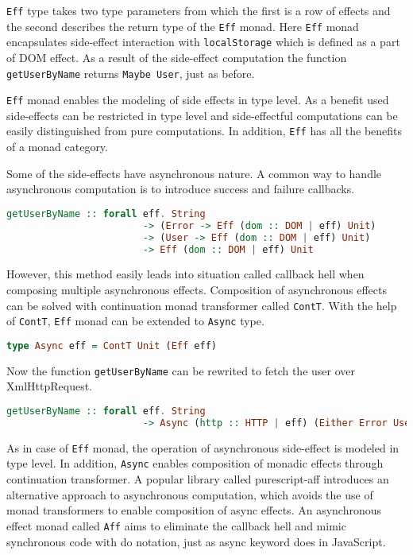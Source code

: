 \documentclass[article]{aaltoseries}
\begin{document}
      \lstinline|Eff| type takes two type parameters from which the first is a
      row of effects and the second describes the return type of the
      \lstinline|Eff| monad. Here \lstinline|Eff| monad encapsulates side-effect
      interaction with \lstinline|localStorage| which is defined as a part of
      DOM effect. As a result of the side-effect computation the function
      \lstinline|getUserByName| returns \lstinline|Maybe User|, just as before.
 
      \lstinline|Eff| monad enables the modeling of side effects in type level.
      As a benefit used side-effects can be restricted in type level and
      side-effectful computations can be easily distinguished from pure
      computations. In addition, \lstinline|Eff| has all the benefits of a monad
      category.
 
      Some of the side-effects have asynchronous nature. A common way to handle
      asynchronous computation is to introduce success and failure callbacks.
 
      \begin{lstlisting}[language=Haskell]
        getUserByName :: forall eff. String 
                        -> (Error -> Eff (dom :: DOM | eff) Unit) 
                        -> (User -> Eff (dom :: DOM | eff) Unit)
                        -> Eff (dom :: DOM | eff) Unit
      \end{lstlisting}
 
      However, this method easily leads into situation called callback hell when
      composing multiple asynchronous effects. Composition of asynchronous
      effects can be solved with continuation monad transformer called
      \lstinline|ContT|. With the help of \lstinline|ContT|, \lstinline|Eff|
      monad can be extended to \lstinline|Async| type.
 
      \begin{lstlisting}[language=Haskell]
        type Async eff = ContT Unit (Eff eff)
      \end{lstlisting}

      Now the function \lstinline|getUserByName| can be rewrited to fetch the
      user over XmlHttpRequest.

      \begin{lstlisting}[language=Haskell]
        getUserByName :: forall eff. String 
                        -> Async (http :: HTTP | eff) (Either Error User)
      \end{lstlisting}
 
      As in case of \lstinline|Eff| monad, the operation of asynchronous
      side-effect is modeled in type level. In addition, \lstinline|Async|
      enables composition of monadic effects through continuation transformer. A
      popular library called purescript-aff introduces an alternative approach
      to asynchronous computation, which avoids the use of monad transformers to
      enable composition of async effects. An asynchronous effect monad called
      \lstinline|Aff| aims to eliminate the callback hell and mimic synchronous
      code with do notation, just as async keyword does in JavaScript.
 
\end{document}
